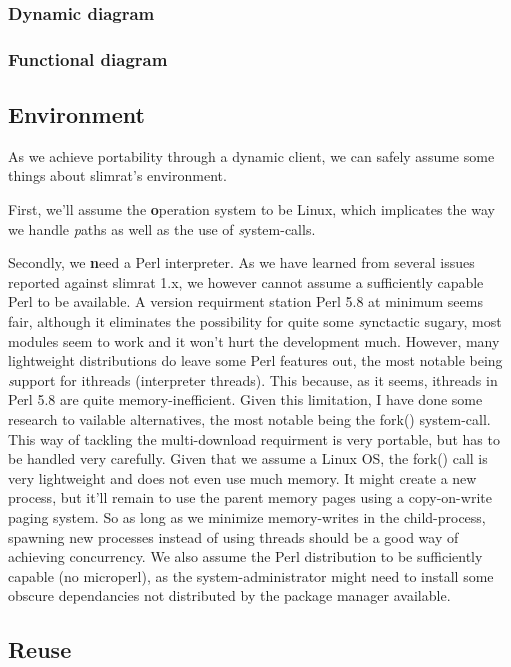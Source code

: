 \documentclass{article}
\begin{document}
\subsubsection{Dynamic diagram}

\subsubsection{Functional diagram}

\subsection{Environment}

As we achieve portability through a dynamic client, we can safely assume some things about slimrat's environment.

First, we'll assume the {\textbf operation system to be Linux}, which implicates the way we handle {\textit paths} as well as the use of {\textit system-calls}.

Secondly, we {\textbf need a Perl interpreter}. As we have learned from several issues reported against slimrat 1.x, we however cannot assume a sufficiently capable Perl to be available. A version requirment station Perl 5.8 at minimum seems fair, although it eliminates the possibility for quite some {\textit synctactic sugary}, most modules seem to work and it won't hurt the development much. However, many lightweight distributions do leave some Perl features out, the most notable being {\textit support for ithreads} (interpreter threads). This because, as it seems, ithreads in Perl 5.8 are quite memory-inefficient. Given this limitation, I have done some research to vailable alternatives, the most notable being the fork() system-call. This way of tackling the multi-download requirment is very portable, but has to be handled very carefully. Given that we assume a Linux OS, the fork() call is very lightweight and does not even use much memory. It might create a new process, but it'll remain to use the parent memory pages using a copy-on-write paging system. So as long as we minimize memory-writes in the child-process, spawning new processes instead of using threads should be a good way of achieving concurrency.
We also assume the Perl distribution to be sufficiently capable (no microperl), as the system-administrator might need to install some obscure dependancies not distributed by the package manager available.

\subsection{Reuse}
\end{document}
